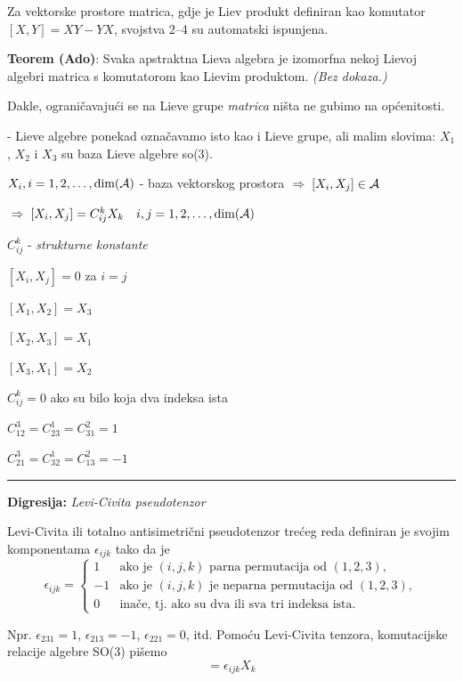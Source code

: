 Za vektorske prostore matrica, gdje je Liev produkt definiran kao
komutator $[X,Y]=XY-YX$, svojstva 2--4 su automatski ispunjena.

\textbf{Teorem (Ado)}: Svaka apstraktna Lieva algebra je izomorfna nekoj
 Lievoj algebri matrica s komutatorom kao Lievim produktom. \emph{(Bez
dokaza.)}

Dakle, ograničavajući se na Lieve grupe \emph{matrica} ništa ne gubimo
na općenitosti.

- Lieve algebre ponekad označavamo isto kao i Lieve grupe, ali malim slovima:
  $X_1$, $X_2$ i $X_3$ su baza Lieve algebre so(3).

$X_i, i=1,2,\ldots, \textrm{dim}(\mathcal{A})$ - baza vektorskog prostora 
  $\;\Rightarrow\; [X_i, X_j]\in\mathcal{A}$

$\;\Rightarrow\; [X_i, X_j]=C_{ij}^{k}X_k  \quad i,j=1,2,\ldots, \textrm{dim}(\mathcal{A})$

$C_{ij}^{k}$ - \emph{strukturne konstante}

\begin{primjer}
$[X_i,X_j]=0$ za $i=j$ 

$[X_1,X_2] = X_3$


$[X_2, X_3]=X_1$ 

$[X_3,X_1]=X_2$

$C_{ij}^{k}=0$ ako su bilo koja dva indeksa ista

$C_{12}^3=C_{23}^{1}=C_{31}^{2}=1$

$C_{21}^3=C_{32}^{1}=C_{13}^{2}=-1$

\end{primjer}

\rule{3cm}{0.5pt}

\textbf{Digresija:} \emph{Levi-Civita pseudotenzor}

Levi-Civita ili totalno antisimetrični pseudotenzor trećeg reda definiran
je svojim komponentama $\epsilon_{ijk}$ tako da je
\begin{displaymath}
\epsilon_{ijk}=
\begin{cases}
1& \text{ako je $(i,j,k)$ parna permutacija od $(1,2,3)$}, \\
-1& \text{ako je $(i,j,k)$ je neparna permutacija od $(1,2,3)$}, \\
0& \text{inače, tj. ako su dva ili sva tri indeksa ista}.
\end{cases} 
\end{displaymath}

Npr. $\epsilon_{231}=1$, $\epsilon_{213}=-1$, $\epsilon_{221}=0$, itd.
Pomoću Levi-Civita tenzora, komutacijske relacije algebre SO(3) pišemo
\begin{displaymath}
 [X_i, X_j]=\epsilon_{ijk} X_k  
\end{displaymath}

